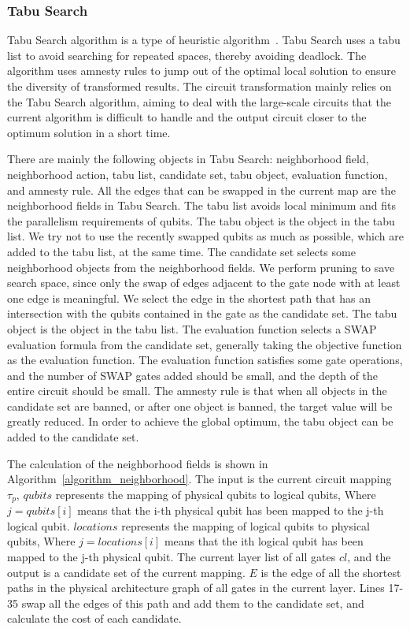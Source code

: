 \documentclass[runningheads]{llncs}
\begin{document}
\subsubsection{Tabu Search}
Tabu Search algorithm is a type of heuristic algorithm~\cite{Glover1990}. Tabu Search uses a tabu list to avoid searching for repeated spaces, thereby avoiding deadlock. The algorithm uses amnesty rules to jump out of the optimal local solution to ensure the diversity of transformed results. The circuit transformation mainly relies on the Tabu Search algorithm, aiming to deal with the large-scale circuits that the current algorithm is difficult to handle and the output circuit closer to the optimum solution in a short time.


There are mainly the following objects in Tabu Search: neighborhood field, neighborhood action, tabu list, candidate set, tabu object, evaluation function, and amnesty rule. All the edges that can be swapped in the current map are the neighborhood fields in Tabu Search. The tabu list avoids local minimum and fits the parallelism requirements of qubits. The tabu object is the object in the tabu list. We try not to use the recently swapped qubits as much as possible, which are added to the tabu list, at the same time. The candidate set selects some neighborhood objects from the neighborhood fields.  We perform pruning to save search space, since only the swap of edges adjacent to the gate node with at least one edge is meaningful. We select the edge in the shortest path that has an intersection with the qubits contained in the gate as the candidate set.
The tabu object is the object in the tabu list. The evaluation function selects a SWAP evaluation formula from the candidate set, 
generally taking the objective function as the evaluation function. The evaluation function satisfies some gate operations, 
and the number of SWAP gates added should be small, and the depth of the entire circuit should be small. The amnesty rule is that when all objects in the candidate set are banned,  or after one object is banned, the target value will be greatly reduced. In order to achieve the global optimum, the tabu object can be added to the candidate set.

The calculation of the neighborhood fields is shown in Algorithm~\ref{algorithm_neighborhood}. The input is the current circuit mapping $\tau_{p}$, $ qubits $ represents the mapping of physical qubits to logical qubits, Where $ j = qubits [i] $ means that the i-th physical qubit has been mapped to the j-th logical qubit. $ locations $ represents the mapping of logical qubits to physical qubits, Where $ j = locations [i] $ means that the ith logical qubit has been mapped to the j-th physical qubit.
The current layer list of all gates $cl$, and the output is a candidate set of the current mapping. $E$ is the edge of all the shortest paths in the physical architecture graph of all gates in the current layer. Lines 17-35 swap all the edges of this path and add them to the candidate set, and calculate the cost of each candidate.
\end{document}
